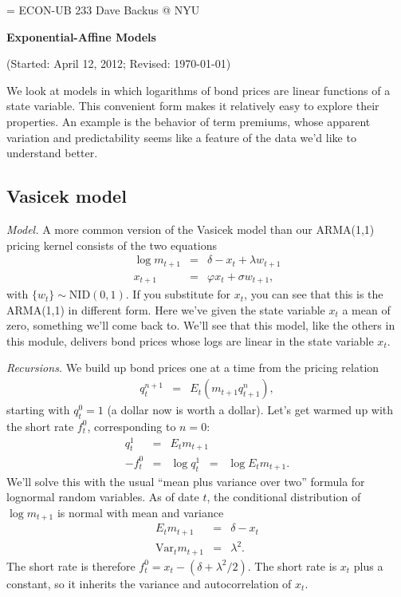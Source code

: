 \documentclass[11pt]{article}
\begin{document}
\parskip=\bigskipamount
\parindent=0.0in
\thispagestyle{empty}
{\large ECON-UB 233 \hfill Dave Backus @ NYU}

\bigskip\bigskip
\centerline{\Large \bf Exponential-Affine Models}
\centerline{(Started: April 12, 2012; Revised: \today)}

\bigskip
We look at models in which logarithms of bond
prices are linear functions of a state variable.
This convenient form makes it relatively easy to explore their
properties.
An example is the behavior of term premiums,
whose apparent variation  and predictability
seems like a feature of the data we'd like to understand better.


\subsection*{Vasicek model}


{\it Model.\/}
A more common version of the Vasicek model than our ARMA(1,1) pricing kernel
consists of the two equations
\begin{eqnarray*}
    \log m_{t+1} &=& \delta - x_t + \lambda w_{t+1} \\
         x_{t+1} &=& \varphi x_t + \sigma w_{t+1} ,
\end{eqnarray*}
with $\{ w_t \} \sim \mbox{NID}(0,1)$.
If you substitute for $x_t$, you can see that this is the ARMA(1,1)
in different form.
Here we've given the state variable $x_t$ a mean of zero,
something we'll come back to.
We'll see that this model, like the others in this module,
delivers bond prices whose logs are linear in the state variable $x_t$.



{\it Recursions.\/}
We build up bond prices one at a time from
the pricing relation
\begin{eqnarray*}
    q^{n+1}_t &=& E_t \left( m_{t+1} q^n_{t+1} \right) ,
\end{eqnarray*}
starting with $q^0_t = 1$ (a dollar now is worth a dollar).
Let's get warmed up with the short rate $f^0_t$, corresponding
to $n=0$:
\begin{eqnarray*}
    q^1_t   &=&  E_t m_{t+1} \\
    - f^0_t &=&  \log q^1_{t} \;\;=\;\; \log E_t m_{t+1} .
\end{eqnarray*}
We'll solve this with the usual ``mean plus variance over two''
formula for lognormal random variables.
As of date $t$,
the conditional distribution of $\log m_{t+1}$ is
normal with mean and variance
\begin{eqnarray*}
    E_t m_{t+1} &=& \delta - x_t \\
    \mbox{Var}_t m_{t+1} &=& \lambda^2 .
\end{eqnarray*}
The short rate is therefore
$ f^0_t = x_t - (\delta + \lambda^2/2)$.
The short rate is $x_t$ plus a constant,
so it inherits the variance and autocorrelation of $x_t$.
\end{document}
